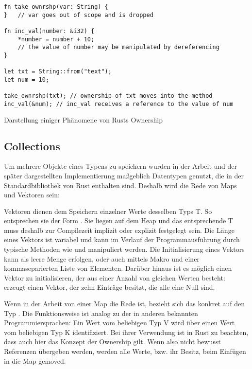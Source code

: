 \begin{listing}[th]
\begin{verbatim}
fn take_ownrshp(var: String) {
}   // var goes out of scope and is dropped

fn inc_val(number: &i32) {
    *number = number + 10;
    // the value of number may be manipulated by dereferencing
}

let txt = String::from("text");
let num = 10;

take_ownrshp(txt); // ownership of txt moves into the method
inc_val(&num); // inc_val receives a reference to the value of num
\end{verbatim}
\caption{Darstellung einiger Phänomene von Rusts Ownership}
\label{lst:ownership}
\end{listing}

\subsection{Collections}

Um mehrere Objekte eines Typens zu speichern wurden in der Arbeit und der später dargestellten Implementierung maßgeblich Datentypen genutzt, die in der Standardbibliothek von Rust enthalten sind. Deshalb wird die Rede von Maps und Vektoren sein:

Vektoren dienen dem Speichern einzelner Werte desselben Typs T. So entsprechen sie der Form . Sie liegen auf dem Heap und das entsprechende T muss deshalb zur Compilezeit implizit oder explizit festgelegt sein. Die Länge eines Vektors ist variabel und kann im Verlauf der Programmausführung durch typische Methoden wie  und  manipuliert werden. Die Initialisierung eines Vektors kann als leere Menge erfolgen, oder auch mittels Makro  und einer kommaseparierten Liste von Elementen. Darüber hinaus ist es möglich einen Vektor zu initialisieren, der aus einer Anzahl von gleichen Werten besteht:  erzeugt einen Vektor, der zehn Einträge besitzt, die alle eine Null sind.

Wenn in der Arbeit von einer Map die Rede ist, bezieht sich das konkret auf den Typ . Die Funktionsweise ist analog zu der in anderen bekannten Programmiersprachen: Ein Wert vom beliebigen Typ V wird über einen Wert vom beliebigen Typ K identifiziert. Bei ihrer Verwendung ist in Rust zu beachten, dass auch hier das Konzept der Ownership gilt. Wenn also nicht bewusst Referenzen übergeben werden, werden alle Werte, bzw. ihr Besitz, beim Einfügen in die Map gemoved. 

